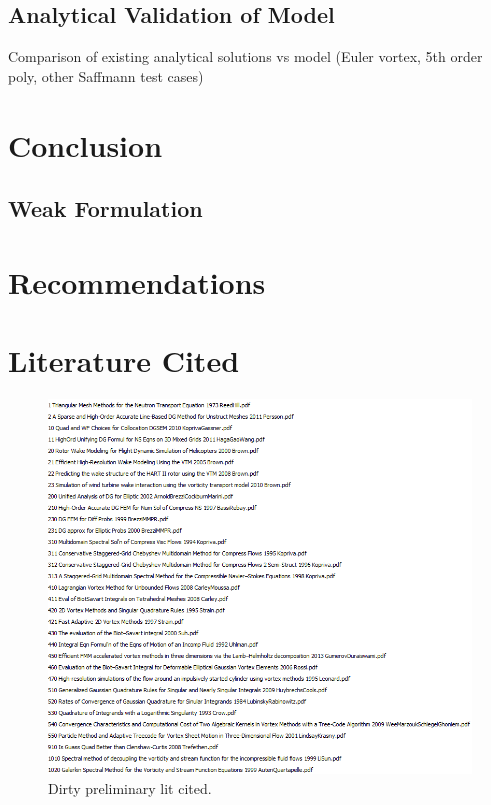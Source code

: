 \documentclass[letterpaper,12pt]{report}
\begin{document}
\section{Analytical Validation of Model}
Comparison of existing analytical solutions vs model (Euler vortex, 5th order poly, other Saffmann test cases)
\section{}
\chapter{Conclusion}
\section{Weak Formulation}
\chapter{Recommendations}
\chapter{Literature Cited}
\begin{figure}
\centering
\includegraphics[width=1.4\textwidth]{LitStart.PNG}
\caption{\label{fig:ring}Dirty preliminary lit cited.}
\end{figure}
\end{document}
